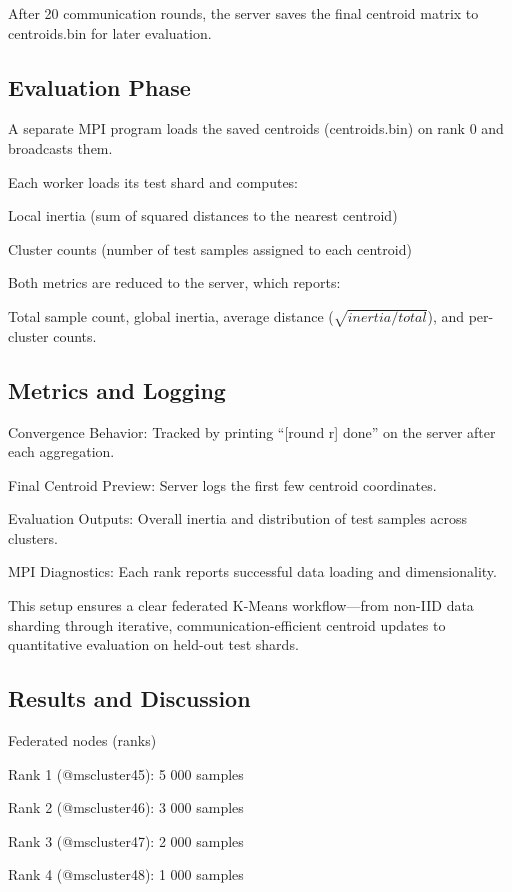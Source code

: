 After 20 communication rounds, the server saves the final centroid matrix to centroids.bin for later evaluation.


\subsection{Evaluation Phase}

A separate MPI program loads the saved centroids (centroids.bin) on rank 0 and broadcasts them.

Each worker loads its test shard and computes:

Local inertia (sum of squared distances to the nearest centroid)

Cluster counts (number of test samples assigned to each centroid)

Both metrics are reduced to the server, which reports:

Total sample count, global inertia, average distance (\(\sqrt{inertia/total}\)), and per-cluster counts.


\subsection{Metrics and Logging}

Convergence Behavior: Tracked by printing “[round r] done” on the server after each aggregation.

Final Centroid Preview: Server logs the first few centroid coordinates.

Evaluation Outputs: Overall inertia and distribution of test samples across clusters.

MPI Diagnostics: Each rank reports successful data loading and dimensionality.

This setup ensures a clear federated K-Means workflow—from non-IID data sharding through iterative, communication-efficient centroid updates to quantitative evaluation on held-out test shards.


\subsection{Results and Discussion}
Federated nodes (ranks)

Rank 1 (@mscluster45): 5 000 samples

Rank 2 (@mscluster46): 3 000 samples

Rank 3 (@mscluster47): 2 000 samples

Rank 4 (@mscluster48): 1 000 samples

